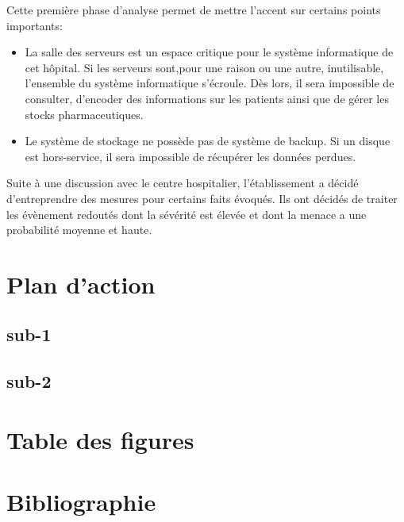 \documentclass[12pt]{article}
\begin{document}
\justify
Cette première phase d'analyse permet de mettre l'accent sur certains points importants:
\begin{itemize}
\item La salle des serveurs est un espace critique pour le système informatique de cet hôpital. Si les serveurs sont,pour une raison ou une autre, inutilisable, l'ensemble du système informatique s'écroule. Dès lors, il sera impossible de consulter, d'encoder des informations sur les patients ainsi que de gérer les stocks pharmaceutiques.
\item Le système de stockage ne possède pas de système de backup. Si un disque est hors-service, il sera impossible de récupérer les données perdues.
\end{itemize}
\justify
Suite à une discussion avec le centre hospitalier, l'établissement a décidé d'entreprendre des mesures pour certains faits évoqués. Ils ont décidés de traiter les évènement redoutés dont la sévérité est élevée et dont la menace a une probabilité moyenne et haute.

\section{Plan d'action}

\subsection{sub-1}

\subsection{sub-2}

\newpage


\section*{Table des figures}
\makeatletter
{}%
\makeatother
{}%


\nocite{*}
\section*{Bibliographie}
\printbibliography[heading=none]
%

\end{document}
